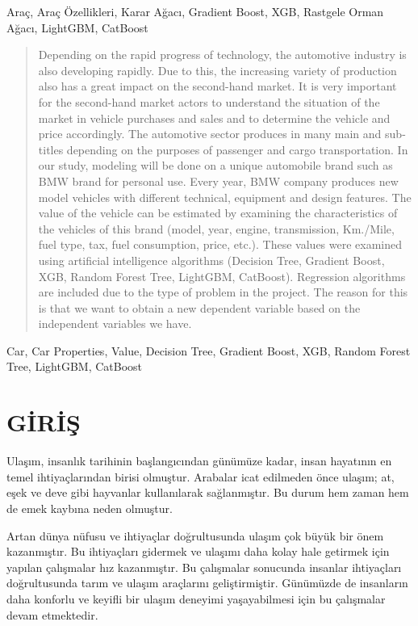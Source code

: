 \documentclass[conference]{IEEEtran}
\begin{document}
\begin{IEEEanahtar}
Araç, Araç Özellikleri, Karar Ağacı, Gradient Boost, XGB, Rastgele Orman Ağacı, LightGBM, CatBoost
\end{IEEEanahtar}

\begin{abstract}
Depending on the rapid progress of technology, the automotive industry is also developing rapidly. Due to this, the increasing variety of production also has a great impact on the second-hand market. It is very important for the second-hand market actors to understand the situation of the market in vehicle purchases and sales and to determine the vehicle and price accordingly. The automotive sector produces in many main and sub-titles depending on the purposes of passenger and cargo transportation. In our study, modeling will be done on a unique automobile brand such as BMW brand for personal use. Every year, BMW company produces new model vehicles with different technical, equipment and design features. The value of the vehicle can be estimated by examining the characteristics of the vehicles of this brand (model, year, engine, transmission, Km./Mile, fuel type, tax, fuel consumption, price, etc.). These values were examined using artificial intelligence algorithms (Decision Tree, Gradient Boost, XGB, Random Forest Tree, LightGBM, CatBoost). Regression algorithms are included due to the type of problem in the project. The reason for this is that we want to obtain a new dependent variable based on the independent variables we have.
\end{abstract}

\begin{IEEEkeywords}
Car, Car Properties, Value, Decision Tree, Gradient Boost, XGB, Random Forest Tree, LightGBM, CatBoost
\end{IEEEkeywords}

\section{\textbf{GİRİŞ}}
\quad Ulaşım, insanlık tarihinin başlangıcından günümüze kadar, insan hayatının en temel ihtiyaçlarından birisi olmuştur. Arabalar icat edilmeden önce ulaşım; at, eşek ve deve gibi hayvanlar kullanılarak sağlanmıştır. Bu durum hem zaman hem de emek kaybına neden olmuştur.

\quad Artan dünya nüfusu ve ihtiyaçlar doğrultusunda ulaşım çok büyük bir önem kazanmıştır. Bu ihtiyaçları gidermek ve ulaşımı daha kolay hale getirmek için yapılan çalışmalar hız kazanmıştır. Bu çalışmalar sonucunda insanlar ihtiyaçları doğrultusunda tarım ve ulaşım araçlarını geliştirmiştir. Günümüzde de insanların daha konforlu ve keyifli bir ulaşım deneyimi yaşayabilmesi için bu çalışmalar devam etmektedir.
\end{document}
